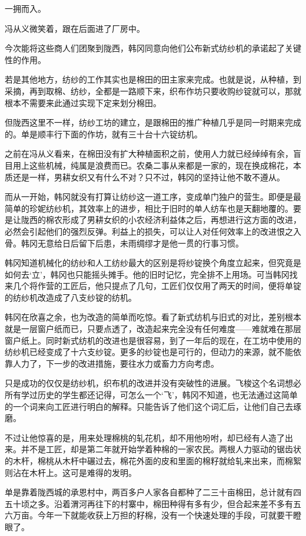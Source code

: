 一拥而入。

冯从义微笑着，跟在后面进了厂房中。

今次能将这些商人们团聚到陇西，韩冈同意向他们公布新式纺纱机的承诺起了关键性的作用。

若是其他地方，纺纱的工作其实也是棉田的田主家来完成。也就是说，从种植，到采摘，再到取棉、纺纱，全都是一路顺下来，织布作坊只要收购纱锭就可以，那就根本不需要来此通过实现下定来划分棉田。

但陇西这里不一样，纺纱工坊的建立，是跟棉田的推广种植几乎是同一时期来完成的。单是顺丰行下面的作坊，就有三十台十六锭纺机。

之前在冯从义看来，在棉田没有扩大种植面积之前，使用人力就已经绰绰有余，盲目用上这些机械，纯属是浪费而已。农桑二事从来都是一家的，现在换成棉花，本质还是一样，男耕女织又有什么不对？只不过，韩冈的坚持让他不敢不遵从。

而从一开始，韩冈就没有打算让纺纱这一道工序，变成单门独户的营生。即便是最简单的珍妮纺纱机，其效率上的进步，相比于旧时的单人纺车也是天翻地覆的。要是让陇西的棉农形成了男耕女织的小农经济利益体之后，再想进行这方面的改进，必然会引起他们的强烈反弹。利益上的损失，可以让人对任何效率上的改进恨之入骨。韩冈无意给日后留下后患，未雨绸缪才是他一贯的行事习惯。

韩冈知道机械化的纺纱和人工纺纱最大的区别是将纱锭换个角度立起来，但究竟是如何去‘立’，韩冈也只能摇头摊手。他的旧时记忆，完全排不上用场。可当韩冈找来几个将作营的工匠后，他只提点了几句，工匠们仅仅用了两天的时间，便将单锭的纺纱机改造成了八支纱锭的纺机。

韩冈在欣喜之余，也为改造的简单而吃惊。看了新式纺机与旧式的对比，差别根本就是一层窗户纸而已，只要点透了，改造起来完全没有任何难度——难就难在那层窗户纸上。同时新式纺机的改进也是很容易，到了一年后的现在，在工坊中使用的纺纱机已经变成了十六支纱锭。更多的纱锭也是可行的，但动力的来源，就不能依靠人力了，下一步的改进措施，要往水力或畜力方向考虑。

只是成功的仅仅是纺纱机，织布机的改进并没有突破性的进展。飞梭这个名词想必所有学过历史的学生都还记得，可怎么一个‘飞’，韩冈不知道，也无法通过这简单的一个词来向工匠进行明白的解释。只能告诉了他们这个词汇后，让他们自己去琢磨。

不过让他惊喜的是，用来处理棉桃的轧花机，却不用他吩咐，却已经有人造了出来。并不是工匠，却是第二年就开始学着种棉的一家农民。两根人力驱动的锯齿状的木杆，棉桃从木杆中碾过去，棉花外面的皮和里面的棉籽就给轧来出来，而棉絮则沾在木杆上。这可是难得的发明。

单是靠着陇西城的承恩村中，两百多户人家各自都种了二三十亩棉田，总计就有四五十顷之多。沿着渭河再往下的村寨中，棉田种得有多有少，但合起来差不多有五六万亩。今年一下就能收获上万担的籽棉，没有一个快速处理的手段，可就要干瞪眼了。

